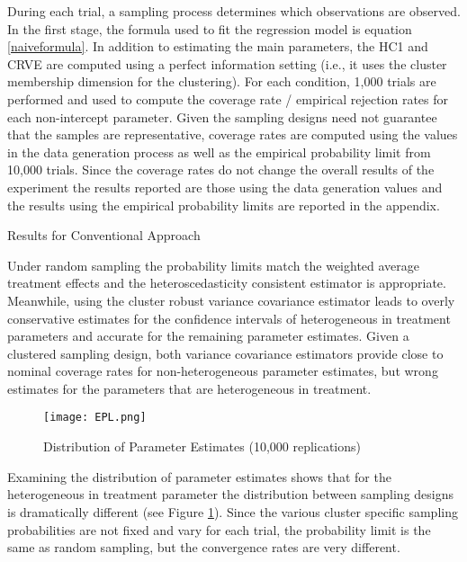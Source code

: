 \documentclass{jbsc}
\begin{document}
During each trial, a sampling process determines which observations are observed. In the first stage, the formula used to fit the regression model is equation \ref{naiveformula}. In addition to estimating the main parameters, the HC1 and CRVE are computed using a perfect information setting (i.e., it uses the cluster membership dimension for the clustering). For each condition, 1,000 trials are performed and used to compute the coverage rate / empirical rejection rates for each non-intercept parameter. Given the sampling designs need not guarantee that the samples are representative, coverage rates are computed using the values in the data generation process as well as the empirical probability limit from 10,000 trials. Since the coverage rates do not change the overall results of the experiment the results reported are those using the data generation values and the results using the empirical probability limits are reported in the appendix.

\begin{table}[hbpt]
	\centering
    \caption{Results for Conventional Approach}
	\label{Conventional}
	
\end{table}

Under random sampling the probability limits match the weighted average treatment effects and the heteroscedasticity consistent estimator is appropriate. Meanwhile, using the cluster robust variance covariance estimator leads to overly conservative estimates for the confidence intervals of heterogeneous in treatment parameters and accurate for the remaining parameter estimates. Given a clustered sampling design, both variance covariance estimators provide close to nominal coverage rates for non-heterogeneous parameter estimates, but wrong estimates for the parameters that are heterogeneous in treatment.

\begin{figure}[hbpt]
	\texttt{[image: EPL.png]}
	\caption{Distribution of Parameter Estimates (10,000 replications)}
	\label{EPL}
\end{figure}

Examining the distribution of parameter estimates shows that for the heterogeneous in treatment parameter the distribution between sampling designs is dramatically different (see Figure \ref{EPL}). Since the various cluster specific sampling probabilities are not fixed and vary for each trial, the probability limit is the same as random sampling, but the convergence rates are very different.
\end{document}
